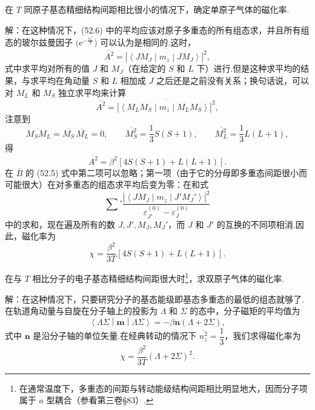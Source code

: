 \begin{xiti}

\quad 在 $T$ 同原子基态精细结构间距相比很小的情况下，确定单原子气体的磁化率.

解：在这种情况下，(52.6) 中的平均应该对原子多重态的所有组态求，并且所有组态的玻尔兹曼因子 $\big(\mathrm{e}^{-\frac{\varepsilon_k'}{T}}\big)$ 可以认为是相同的.这时，
\begin{equation*}
  \overline{A^2}=\overline{\left|\left\langle JM_J\middle|m_z\middle|JM_J\right\rangle\right|^2},
\end{equation*}
式中求平均对所有的值 $J$ 和 $M_J$（在给定的 $S$ 和 $L$ 下）进行.但是这种求平均的结果，与求平均在角动量 $S$ 和 $L$ 相加成 $J$ 之后还是之前没有关系；换句话说，可以对 $M_L$ 和 $M_S$ 独立求平均来计算
\begin{equation*}
  \overline{A^2}=\overline{\left|\left\langle M_LM_S\middle|m_z\middle|M_LM_S\right\rangle\right|^2},
\end{equation*}
注意到
\begin{equation*}
  \overline{M_SM_L}=\overline{M_S}\,\overline{M_L}=0,\qquad
  \overline{M_S^2}=\frac{1}{3}S(S+1),\qquad
  \overline{M_L^2}=\frac{1}{3}L(L+1),
\end{equation*}
得
\begin{equation*}
  \overline{A^2}=\beta^2\left[4S(S+1)+L(L+1)\right].
\end{equation*}
在 $\overline{B}$ 的 (52.5) 式中第二项可以忽略；第一项（由于它的分母即多重态间距很小而可能很大）在对多重态的组态求平均后变为零：在和式
\begin{equation*}
  \sum{}'\frac{\left|\left\langle JM_J\middle|m_z\middle|J'M_J'\right\rangle\right|^2}
  {\varepsilon_{J'}^{(0)}-\varepsilon_J^{(0)}}
\end{equation*}
中的求和，现在遍及所有的数 $J,J',M_J,M_J'$，而 $J$ 和 $J'$ 的互换的不同项相消.因此，磁化率为
\begin{equation*}
  \chi=\frac{\beta^2}{3T}\left[4S(S+1)+L(L+1)\right].
\end{equation*}

\quad 在与 $T$ 相比分子的电子基态精细结构间距很大时\footnote{在通常温度下，多重态的间距与转动能级结构间距相比明显地大，因而分子项属于 $a$ 型耦合（参看第三卷§83）.}，求双原子气体的磁化率.

解：在这种情况下，只要研究分子的基态能级即基态多重态的最低的组态就够了.在轨道角动量与自旋在分子轴上的投影为 $\Lambda$ 和 $\Sigma$ 的态中，分子磁矩的平均值为
\begin{equation*}
  \left\langle\Lambda\Sigma\middle|\boldsymbol{m}\middle|\Lambda\Sigma\right\rangle
  =-\beta\boldsymbol{n}\left(\Lambda+2\Sigma\right),
\end{equation*}
式中 $\boldsymbol{n}$ 是沿分子轴的单位矢量.在经典转动的情况下 $\overline{n_z^2}=\dfrac{1}{3}$，我们求得磁化率为
\begin{equation*}
  \chi=\frac{\beta^2}{3T}\left(\Lambda+2\Sigma\right)^2.
\end{equation*}


\end{xiti}
